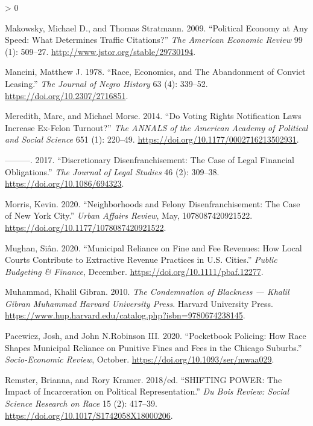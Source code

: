 \documentclass[
  12pt,
]{article}
\newlength{\cslhangindent}
\newenvironment{CSLReferences}[2] %
 {%
  \setlength{\parindent}{0pt}
  \ifodd #1 \everypar{\setlength{\hangindent}{\cslhangindent}}\ignorespaces\fi
  \ifnum #2 > 0
  \setlength{\parskip}{#2\baselineskip}
  \fi
 }%
 {}
\begin{document}
\begin{CSLReferences}{1}{0}
\leavevmode\hypertarget{ref-Makowsky2009}{}%
Makowsky, Michael D., and Thomas Stratmann. 2009. {``Political {Economy} at {Any Speed}: {What Determines Traffic Citations}?''} \emph{The American Economic Review} 99 (1): 509--27. \url{http://www.jstor.org/stable/29730194}.

\leavevmode\hypertarget{ref-Mancini1978}{}%
Mancini, Matthew J. 1978. {``Race, {Economics}, and {The Abandonment} of {Convict Leasing}.''} \emph{The Journal of Negro History} 63 (4): 339--52. \url{https://doi.org/10.2307/2716851}.

\leavevmode\hypertarget{ref-Meredith2014}{}%
Meredith, Marc, and Michael Morse. 2014. {``Do {Voting Rights Notification Laws Increase Ex}-{Felon Turnout}?''} \emph{The ANNALS of the American Academy of Political and Social Science} 651 (1): 220--49. \url{https://doi.org/10.1177/0002716213502931}.

\leavevmode\hypertarget{ref-Meredith2017}{}%
---------. 2017. {``Discretionary {Disenfranchisement}: {The Case} of {Legal Financial Obligations}.''} \emph{The Journal of Legal Studies} 46 (2): 309--38. \url{https://doi.org/10.1086/694323}.

\leavevmode\hypertarget{ref-Morris2020}{}%
Morris, Kevin. 2020. {``Neighborhoods and {Felony Disenfranchisement}: {The Case} of {New York City}.''} \emph{Urban Affairs Review}, May, 1078087420921522. \url{https://doi.org/10.1177/1078087420921522}.

\leavevmode\hypertarget{ref-Mughan2020}{}%
Mughan, Siân. 2020. {``Municipal {Reliance} on {Fine} and {Fee Revenues}: {How Local Courts Contribute} to {Extractive Revenue Practices} in {U}.{S}. {Cities}.''} \emph{Public Budgeting \& Finance}, December. \url{https://doi.org/10.1111/pbaf.12277}.

\leavevmode\hypertarget{ref-Muhammad2010}{}%
Muhammad, Khalil Gibran. 2010. \emph{The {Condemnation} of {Blackness} --- {Khalil Gibran Muhammad} \textbar{} {Harvard University Press}}. {Harvard University Press}. \url{https://www.hup.harvard.edu/catalog.php?isbn=9780674238145}.

\leavevmode\hypertarget{ref-Pacewicz2020}{}%
Pacewicz, Josh, and John N.Robinson III. 2020. {``Pocketbook Policing: {How} Race Shapes Municipal Reliance on Punitive Fines and Fees in the {Chicago} Suburbs.''} \emph{Socio-Economic Review}, October. \url{https://doi.org/10.1093/ser/mwaa029}.

\leavevmode\hypertarget{ref-Remster2018}{}%
Remster, Brianna, and Rory Kramer. 2018/ed. {``{SHIFTING POWER}: {The Impact} of {Incarceration} on {Political Representation}.''} \emph{Du Bois Review: Social Science Research on Race} 15 (2): 417--39. \url{https://doi.org/10.1017/S1742058X18000206}.


\end{CSLReferences}
\end{document}
